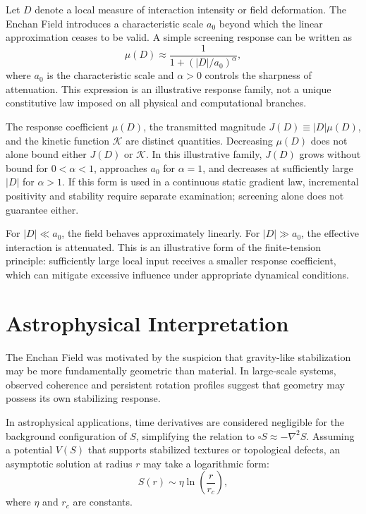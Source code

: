 \documentclass[11pt,a4paper]{article}
\begin{document}
Let $D$ denote a local measure of interaction intensity or field deformation. The Enchan Field introduces a characteristic scale $a_0$ beyond which the linear approximation ceases to be valid. A simple screening response can be written as
\begin{equation}
\mu(D) \approx \frac{1}{1 + (|D|/a_0)^\alpha},
\end{equation}
where $a_0$ is the characteristic scale and $\alpha>0$ controls the sharpness of attenuation. This expression is an illustrative response family, not a unique constitutive law imposed on all physical and computational branches.

The response coefficient $\mu(D)$, the transmitted magnitude $J(D)\equiv |D|\mu(D)$, and the kinetic function $\mathcal{K}$ are distinct quantities. Decreasing $\mu(D)$ does not alone bound either $J(D)$ or $\mathcal{K}$. In this illustrative family, $J(D)$ grows without bound for $0<\alpha<1$, approaches $a_0$ for $\alpha=1$, and decreases at sufficiently large $|D|$ for $\alpha>1$. If this form is used in a continuous static gradient law, incremental positivity and stability require separate examination; screening alone does not guarantee either.

For $|D| \ll a_0$, the field behaves approximately linearly. For $|D| \gg a_0$, the effective interaction is attenuated. This is an illustrative form of the finite-tension principle: sufficiently large local input receives a smaller response coefficient, which can mitigate excessive influence under appropriate dynamical conditions.

\clearpage

\section{Astrophysical Interpretation}

The Enchan Field was motivated by the suspicion that gravity-like stabilization may be more fundamentally geometric than material. In large-scale systems, observed coherence and persistent rotation profiles suggest that geometry may possess its own stabilizing response.

In astrophysical applications, time derivatives are considered negligible for the background configuration of $S$, simplifying the relation to $\square S \approx -\nabla^2 S$. Assuming a potential $V(S)$ that supports stabilized textures or topological defects, an asymptotic solution at radius $r$ may take a logarithmic form:
\begin{equation}
S(r) \sim \eta \ln\left(\frac{r}{r_c}\right),
\end{equation}
where $\eta$ and $r_c$ are constants.
\end{document}
